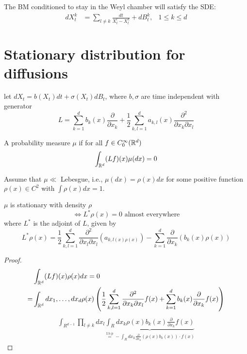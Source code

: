 The BM conditioned to stay in the Weyl chamber will satisfy the SDE:
\begin{align*}
    dX_t^k &= \sum_{l\neq k}\frac{dt}{X_t^l-X_t^k}+dB_t^k, & 1\leq k\leq d
\end{align*}

\section{Stationary distribution for diffusions}

let $dX_t=b(X_t)dt+\sigma(X_t)dB_t$, where $b,\sigma$ are time independent with generator 
\[L=\sum_{k=1}^db_k(x)\frac{\partial}{\partial x_k}+\frac{1}{2}\sum_{k,l=1}^da_{k,l}(x)\frac{\partial^2}{\partial x_k\partial x_l}\]


\begin{definition}\label{def:2.16}
    A probability measure $\mu$  if for all $f\in C_0^\infty(\mathbb{R}^d)$
    \[\int_{\mathbb{R}^d} (Lf)(x)\mu(dx)=0\]
\end{definition}

Assume that $\mu\ll$ Lebesgue, i.e., $\mu(dx)=\rho(x)dx$ for some positive function $\rho(x)\in C^2$ with $\int\rho(x)dx=1$.

\begin{lemma}\label{lem:2.16b}
    $\mu$ is stationary with density $\rho$
    \[\iff L^*\rho(x)=0\text{ almost everywhere}\]
    where $L^*$ is the adjoint of $L$, given by 
    \[L^* \rho(x)=\frac{1}{2}\sum_{k,l=1}^d\frac{\partial^2}{\partial x_l \partial x_l}(a_{k,l(x)\rho(x)})-\sum_{k=1}^d\frac{\partial}{\partial x_k}(b_k(x)\rho(x))\]
\end{lemma}

\begin{proof}
    \begin{align*}
        &\int_{\mathbb{R}^d}(L f)(x)\rho(x)dx=0\\
        =&\int_{\mathbb{R}^d}dx_1,\dots,dx_d\rho(x)\left(\frac{1}{2}\sum_{k,l=1}^d\frac{\partial^2}{\partial x_k\partial x_l} f(x)+\sum_{k=1}^d b_k(x)\frac{\partial}{\partial x_k}f(x)\right)
    \end{align*} 
    \begin{align*}
        \int_{R^{d-1}}\prod_{l\neq k} dx_l\underbrace{\int_R dx_k \rho(x)b_k(x)\frac{\partial }{\partial x_k}f(x)}_{\stackrel{\text{I.b.p}}{=}-\int_R dx_k\frac{\partial}{\partial x_k}(\rho(x)b_k(x)) \cdot f(x)}
    \end{align*}   
\end{proof}

